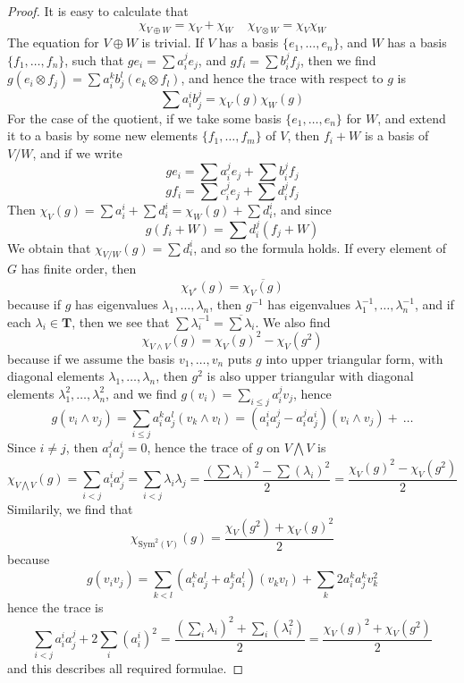 \begin{proof}
    It is easy to calculate that
    \[ \chi_{V \oplus W} = \chi_V + \chi_W\ \ \ \ \ \chi_{V \otimes W} = \chi_V \chi_W \]
    The equation for $V \oplus W$ is trivial. If $V$ has a basis $\{ e_1, \dots, e_n \}$, and $W$ has a basis $\{ f_1, \dots, f_n \}$, such that $ge_i = \sum a_i^j e_j$, and $gf_i = \sum b_i^j f_j$, then we find $g(e_i \otimes f_j) = \sum a_i^k b_j^l (e_k \otimes f_l)$, and hence the trace with respect to $g$ is
    \[ \sum a_i^i b_j^j = \chi_V(g) \chi_W(g) \]
    For the case of the quotient, if we take some basis $\{ e_1, \dots, e_n \}$ for $W$, and extend it to a basis by some new elements $\{ f_1, \dots, f_m \}$ of $V$, then $f_i + W$ is a basis of $V/W$, and if we write
    \[ ge_i = \sum a_i^j e_j + \sum b_i^j f_j \]
    \[ gf_i = \sum c_i^j e_j + \sum d_i^j f_j \]
    Then $\chi_V(g) = \sum a_i^i + \sum d_i^i = \chi_W(g) + \sum d_i^i$, and since
    \[ g(f_i + W) = \sum d_i^j (f_j + W) \]
    We obtain that $\chi_{V/W}(g) = \sum d_i^i$, and so the formula holds. If every element of $G$ has finite order, then
    \[ \chi_{V^*}(g) = \overline{\chi_V(g)} \]
    because if $g$ has eigenvalues $\lambda_1, \dots, \lambda_n$, then $g^{-1}$ has eigenvalues $\lambda_1^{-1}, \dots, \lambda_n^{-1}$, and if each $\lambda_i \in \mathbf{T}$, then we see that $\sum \lambda_i^{-1} = \overline{\sum \lambda_i}$. We also find
    \[ \chi_{V \wedge V}(g) = \chi_V(g)^2 - \chi_V(g^2) \]
    because if we assume the basis $v_1, \dots, v_n$ puts $g$ into upper triangular form, with diagonal elements $\lambda_1, \dots, \lambda_n$, then $g^2$ is also upper triangular with diagonal elements $\lambda_1^2, \dots, \lambda_n^2$, and we find $g(v_i) = \sum_{i \leq j} a_i^j v_j$, hence
    \[ g(v_i \wedge v_j) = \sum_{i \leq j} a_i^k a_j^l (v_k \wedge v_l) = (a_i^i a_j^j - a_i^j a_j^i) (v_i \wedge v_j) +\ \dots \]
    Since $i \neq j$, then $a_i^j a_j^i = 0$, hence the trace of $g$ on $V \bigwedge V$ is
    \[ \chi_{V \bigwedge V}(g) = \sum_{i < j} a_i^i a_j^j = \sum_{i < j} \lambda_i \lambda_j = \frac{\left( \sum \lambda_i \right)^2 - \sum (\lambda_i)^2}{2} = \frac{\chi_V(g)^2 - \chi_V(g^2)}{2} \]
    Similarily, we find that
    \[ \chi_{\text{Sym}^2(V)}(g) = \frac{\chi_V(g^2) + \chi_V(g)^2}{2} \]
    because
    \[ g(v_iv_j) = \sum_{k < l} (a_i^ka_j^l + a_j^ka_i^l) (v_kv_l) + \sum_k 2a_i^ka_j^k v_k^2 \]
    hence the trace is
    \[ \sum_{i < j} a_i^ia_j^j + 2 \sum_i (a_i^i)^2 = \frac{\left( \sum_i \lambda_i \right)^2 + \sum_i (\lambda_i^2)}{2} = \frac{\chi_V(g)^2 + \chi_V(g^2)}{2} \]
    and this describes all required formulae.
\end{proof}

